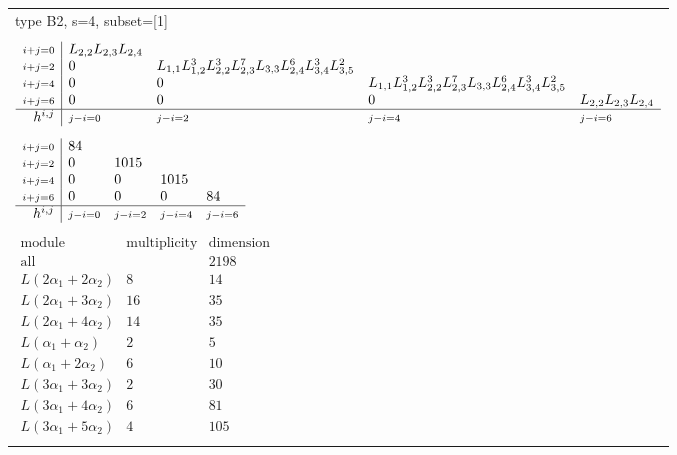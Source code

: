 \documentclass[crop,border=2mm]{standalone}
\begin{document}
\begin{tabular}{l}
{\huge type B2, s=4, subset=[1]}\\ \\


$\displaystyle
\begin{array}{r|l l l l}
	{\scriptstyle i+j=0}&L_{2,2}L_{2,3}L_{2,4}&&&\\
	{\scriptstyle i+j=2}&0&L_{1,1}L_{1,2}^{3}L_{2,2}^{3}L_{2,3}^{7}L_{3,3}L_{2,4}^{6}L_{3,4}^{3}L_{3,5}^{2}&&\\
	{\scriptstyle i+j=4}&0&0&L_{1,1}L_{1,2}^{3}L_{2,2}^{3}L_{2,3}^{7}L_{3,3}L_{2,4}^{6}L_{3,4}^{3}L_{3,5}^{2}&\\
	{\scriptstyle i+j=6}&0&0&0&L_{2,2}L_{2,3}L_{2,4}\\
	\hline h^{i,j}&{\scriptstyle j-i=0}&{\scriptstyle j-i=2}&{\scriptstyle j-i=4}&{\scriptstyle j-i=6}
\end{array}
$ \\ \\


$\displaystyle
\begin{array}{r|l l l l}
	{\scriptstyle i+j=0}&84&&&\\
	{\scriptstyle i+j=2}&0&1015&&\\
	{\scriptstyle i+j=4}&0&0&1015&\\
	{\scriptstyle i+j=6}&0&0&0&84\\
	\hline h^{i,j}&{\scriptstyle j-i=0}&{\scriptstyle j-i=2}&{\scriptstyle j-i=4}&{\scriptstyle j-i=6}
\end{array}
$ \\ \\


$\displaystyle
\begin{array}{rll}
	\text{module}&\text{multiplicity}&\text{dimension} \\ \hline \text{all}&&2198 \\
	L\left( 2\alpha_{1}+ 2\alpha_{2}\right)&8&14\\
	L\left( 2\alpha_{1}+ 3\alpha_{2}\right)&16&35\\
	L\left( 2\alpha_{1}+ 4\alpha_{2}\right)&14&35\\
	L\left(\alpha_{1}+\alpha_{2}\right)&2&5\\
	L\left(\alpha_{1}+ 2\alpha_{2}\right)&6&10\\
	L\left( 3\alpha_{1}+ 3\alpha_{2}\right)&2&30\\
	L\left( 3\alpha_{1}+ 4\alpha_{2}\right)&6&81\\
	L\left( 3\alpha_{1}+ 5\alpha_{2}\right)&4&105
\end{array}
$ \\ \\

\end{tabular}
\end{document}
